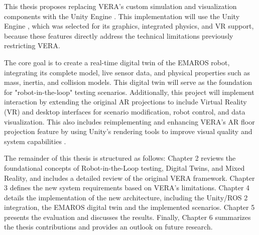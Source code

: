 This thesis proposes replacing VERA’s custom simulation and visualization components\cite{Geh24} with the Unity Engine \cite{Uni23}. This implementation will use the Unity Engine \cite{Uni23}, which was selected for its graphics, integrated physics, and VR support, because these features directly address the technical limitations previously restricting VERA.

The core goal is to create a real-time digital twin\cite{AA23} of the EMAROS robot\cite{Geh24}, integrating its complete model, live sensor data, and physical properties such as mass, inertia, and collision models. This digital twin will serve as the foundation for "robot-in-the-loop" \cite{Hu05} testing scenarios. Additionally, this project will implement interaction by extending the original AR projections \cite{Geg24} to include Virtual Reality (VR) \cite{EM21} and desktop interfaces for scenario modification, robot control, and data visualization. This also includes reimplementing and enhancing VERA's AR floor projection feature by using Unity's rendering tools to improve visual quality and system capabilities \cite{Uni23}.

\cite{NOT FINAL}The remainder of this thesis is structured as follows: Chapter 2 reviews the foundational concepts of Robot-in-the-Loop testing, Digital Twins, and Mixed Reality, and includes a detailed review of the original VERA framework. Chapter 3 defines the new system requirements based on VERA's limitations. Chapter 4 details the implementation of the new architecture, including the Unity/ROS 2 integration, the EMAROS digital twin and the implemented scenarios. Chapter 5 presents the evaluation and discusses the results. Finally, Chapter 6 summarizes the thesis contributions and provides an outlook on future research.\cite{NOT FINAL}

